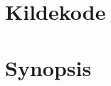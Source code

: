 \documentclass[draft,a4paper,11pt]{article}
\begin{document}
%





\appendix
\section{Kildekode}

\newpage
\section{Synopsis}
%
%

%
%
\end{document}
